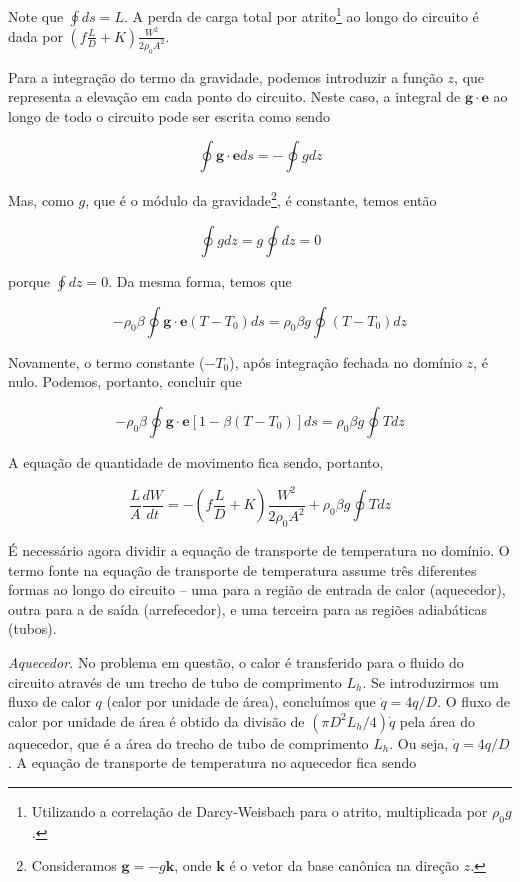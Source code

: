 \documentclass[a4paper,portuguese,10pt]{article}
\renewcommand{\vec}{\mathbf}
\begin{document}
Note que $\oint ds = L$. A perda de carga total por atrito\footnote{Utilizando a correlação de Darcy-Weisbach para o atrito, multiplicada por $\rho_0g$.} ao longo do circuito é dada por $\left(f\frac{L}{D}+K\right)\frac{W^2}{2\rho_0A^2}$.

Para a integração do termo da gravidade, podemos introduzir a função $z$, que representa a elevação em cada ponto do circuito. Neste caso, a integral de $\vec{g}\cdot\vec{e}$ ao longo de todo o circuito pode ser escrita como sendo

\begin{equation}
  \oint\vec{g}\cdot\vec{e}ds = -\oint gdz
\end{equation}

Mas, como $g$, que é o módulo da gravidade\footnote{Consideramos $\vec{g} = -g\vec{k}$, onde $\vec{k}$ é o vetor da base canônica na direção $z$.}, é constante, temos então

\begin{equation}
  \oint gdz = g\oint dz = 0
\end{equation}

porque $\oint dz = 0$. Da mesma forma, temos que

\begin{equation}
  -\rho_0\beta\oint\vec{g}\cdot\vec{e}(T-T_0)ds = \rho_0\beta g\oint(T-T_0)dz
\end{equation}

Novamente, o termo constante ($-T_0$), após integração fechada no domínio $z$, é nulo. Podemos, portanto, concluir que

\begin{equation}
  -\rho_0\beta\oint\vec{g}\cdot\vec{e}[1-\beta(T-T_0)]ds = \rho_0\beta g\oint Tdz
\end{equation}

A equação de quantidade de movimento fica sendo, portanto,

\begin{equation}
  \frac{L}{A}\frac{dW}{dt} = -\left(f\frac{L}{D}+K\right)\frac{W^2}{2\rho_0A^2} + \rho_0\beta g\oint Tdz
\end{equation}

É necessário agora dividir a equação de transporte de temperatura no domínio. O termo fonte na equação de transporte de temperatura assume três diferentes formas ao longo do circuito -- uma para a região de entrada de calor (aquecedor), outra para a de saída (arrefecedor), e uma terceira para as regiões adiabáticas (tubos).

{\it Aquecedor.} No problema em questão, o calor é transferido para o fluido do circuito através de um trecho de tubo de comprimento $L_h$. Se introduzirmos um fluxo de calor $q$ (calor por unidade de área), concluímos que $\dot{q} = 4q/D$. O fluxo de calor por unidade de área é obtido da divisão de $(\pi D^2L_h/4)\dot{q}$ pela área do aquecedor, que é a área do trecho de tubo de comprimento $L_h$. Ou seja, $\dot{q} = 4q/D$. A equação de transporte de temperatura no aquecedor fica sendo
\end{document}
